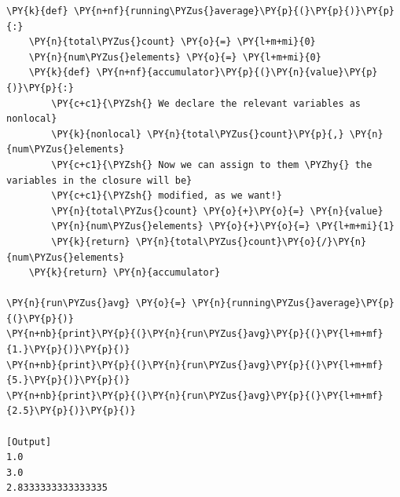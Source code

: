 \begin{Verbatim}[label=\makebox{\url{https://github.com/lucabaldini/cmepda/tree/master/slides/latex/snippets/closure\_right.py}},commandchars=\\\{\}]
\PY{k}{def} \PY{n+nf}{running\PYZus{}average}\PY{p}{(}\PY{p}{)}\PY{p}{:}
    \PY{n}{total\PYZus{}count} \PY{o}{=} \PY{l+m+mi}{0}
    \PY{n}{num\PYZus{}elements} \PY{o}{=} \PY{l+m+mi}{0}
    \PY{k}{def} \PY{n+nf}{accumulator}\PY{p}{(}\PY{n}{value}\PY{p}{)}\PY{p}{:}
        \PY{c+c1}{\PYZsh{} We declare the relevant variables as nonlocal}
        \PY{k}{nonlocal} \PY{n}{total\PYZus{}count}\PY{p}{,} \PY{n}{num\PYZus{}elements}
        \PY{c+c1}{\PYZsh{} Now we can assign to them \PYZhy{} the variables in the closure will be}
        \PY{c+c1}{\PYZsh{} modified, as we want!}
        \PY{n}{total\PYZus{}count} \PY{o}{+}\PY{o}{=} \PY{n}{value}
        \PY{n}{num\PYZus{}elements} \PY{o}{+}\PY{o}{=} \PY{l+m+mi}{1}
        \PY{k}{return} \PY{n}{total\PYZus{}count}\PY{o}{/}\PY{n}{num\PYZus{}elements}
    \PY{k}{return} \PY{n}{accumulator}
    
\PY{n}{run\PYZus{}avg} \PY{o}{=} \PY{n}{running\PYZus{}average}\PY{p}{(}\PY{p}{)}
\PY{n+nb}{print}\PY{p}{(}\PY{n}{run\PYZus{}avg}\PY{p}{(}\PY{l+m+mf}{1.}\PY{p}{)}\PY{p}{)}
\PY{n+nb}{print}\PY{p}{(}\PY{n}{run\PYZus{}avg}\PY{p}{(}\PY{l+m+mf}{5.}\PY{p}{)}\PY{p}{)}
\PY{n+nb}{print}\PY{p}{(}\PY{n}{run\PYZus{}avg}\PY{p}{(}\PY{l+m+mf}{2.5}\PY{p}{)}\PY{p}{)}

[Output]
1.0
3.0
2.8333333333333335
\end{Verbatim}
